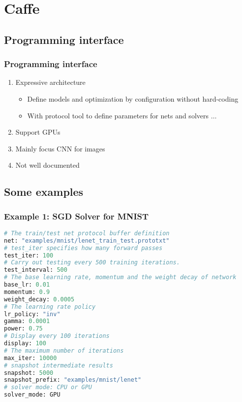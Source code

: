 
\section{Caffe}\label{sec:Caffe}

\subsection{Programming interface}

\begin{frame}
  \MyLogo
  \frametitle{Programming interface}  

\begin{enumerate}
\item Expressive architecture 
\begin{itemize}
\item Define models and optimization by configuration without hard-coding
\item With protocol tool to define parameters for nets and solvers $\ldots$
\end{itemize}
\item Support GPUs 
\item Mainly focus CNN for images
\item Not well documented
\end{enumerate}
\end{frame}

\subsection{Some examples}

\begin{frame}[fragile]
  \MyLogo
  \frametitle{Example 1: SGD Solver for MNIST}  
\begin{tiny}
 \begin{lstlisting}[language=python]
# The train/test net protocol buffer definition
net: "examples/mnist/lenet_train_test.prototxt"
# test_iter specifies how many forward passes
test_iter: 100
# Carry out testing every 500 training iterations.
test_interval: 500
# The base learning rate, momentum and the weight decay of network
base_lr: 0.01
momentum: 0.9
weight_decay: 0.0005
# The learning rate policy
lr_policy: "inv"
gamma: 0.0001
power: 0.75
# Display every 100 iterations
display: 100
# The maximum number of iterations
max_iter: 10000
# snapshot intermediate results
snapshot: 5000
snapshot_prefix: "examples/mnist/lenet"
# solver mode: CPU or GPU
solver_mode: GPU
\end{lstlisting}
\end{tiny}

\end{frame}